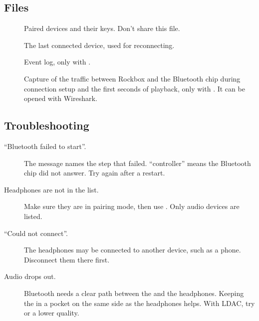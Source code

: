 \subsection{Files}
\begin{description}
  \item[] Paired devices and their keys.
    Don't share this file.
  \item[] The last connected device, used for
    reconnecting.
  \item[] Event log, only with
    .
  \item[] Capture of the traffic between Rockbox
    and the Bluetooth chip during connection setup and the first seconds of
    playback, only with . It can be opened with
    Wireshark.
\end{description}

\subsection{Troubleshooting}
\begin{description}
  \item[``Bluetooth failed to start''.] The message names the step that
    failed. ``controller'' means the Bluetooth chip did not answer. Try again
    after a restart.
  \item[Headphones are not in the list.] Make sure they are in pairing mode,
    then use . Only audio devices are listed.
  \item[``Could not connect''.] The headphones may be connected to another
    device, such as a phone. Disconnect them there first.
  \item[Audio drops out.] Bluetooth needs a clear path between the \dap{} and
    the headphones. Keeping the \dap{} in a pocket on the same side as the
    headphones helps. With LDAC, try  or a lower quality.
\end{description}
